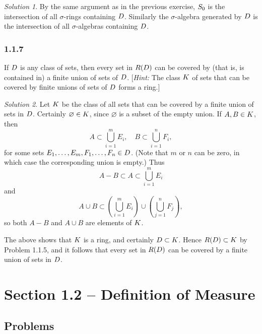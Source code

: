 \documentclass{report}
\let\sc\relax
\newcommand{\sc}[1]{\mathscr{#1}}
\theoremstyle{remark}
\newtheorem*{solution}{Solution}
\begin{document}
\begin{solution}
  By the same argument as in the previous exercise, $\sc S_0$ is the intersection of all $\sigma$-rings containing $\sc D$. Similarly the $\sigma$-algebra generated by $\sc D$ is the intersection of all $\sigma$-algebras containing $\sc D$.
\end{solution}

\subsubsection*{1.1.7}
If $\sc D$ is any class of sets, then every set in $\sc R(\sc D)$ can be covered by (that is, is contained in) a finite union of sets of $\sc D$. [\emph{Hint:} The class $\sc K$ of sets that can be covered by finite unions of sets of $\sc D$ forms a ring.]

\begin{solution}
  Let $\sc K$ be the class of all sets that can be covered by a finite union of sets in $\sc D$. Certainly $\varnothing \in \sc K$, since $\varnothing$ is a subset of the empty union. If $A, B \in \sc K$, then
  \begin{equation*}
    A \subset \bigcup_{i=1}^m E_i, \quad B \subset \bigcup_{i=1}^n F_i,
  \end{equation*}
  for some sets $E_1, \dots, E_m, F_1, \dots, F_n \in \sc D$. (Note that $m$ or $n$ can be zero, in which case the corresponding union is empty.) Thus
  \begin{equation*}
    A - B \subset A \subset \bigcup_{i=1}^m E_i
  \end{equation*}
  and
  \begin{equation*}
    A \cup B \subset \left( \bigcup_{i=1}^m E_i \right) \cup \left( \bigcup_{j=1}^n F_j \right),
  \end{equation*}
  so both $A - B$ and $A \cup B$ are elements of $\sc K$.

  The above shows that $\sc K$ is a ring, and certainly $\sc D \subset \sc K$. Hence $\sc R(\sc D) \subset \sc K$ by Problem 1.1.5, and it follows that every set in $\sc R(\sc D)$ can be covered by a finite union of sets in $\sc D$.
\end{solution}

\section*{Section 1.2 -- Definition of Measure}

\subsection*{Problems}
\end{document}
